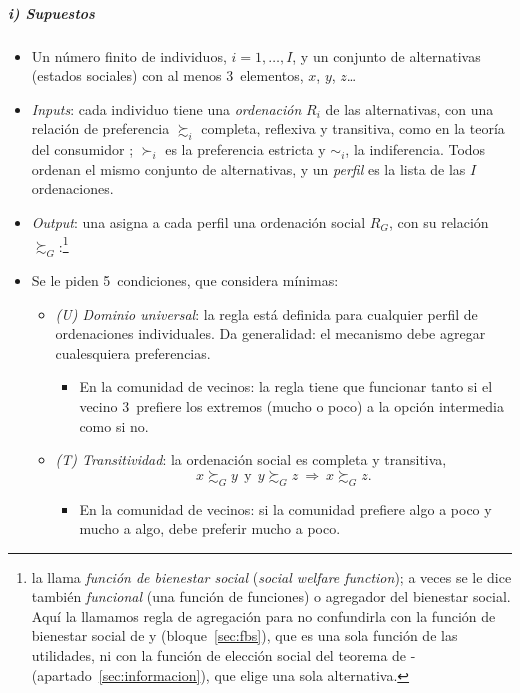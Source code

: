 \documentclass[11pt]{article}
\begin{document}
\subparagraph{i) Supuestos}

\begin{itemize}
\item Un número finito de individuos, $i=1,\dots,I$, y un conjunto de alternativas (estados sociales) con al menos 3~elementos, $x$, $y$, $z$\ldots
\item \emph{Inputs}: cada individuo tiene una \emph{ordenación} $R_i$ de las alternativas, con una relación de preferencia $\succsim_i$ completa, reflexiva y transitiva, como en la teoría del consumidor ; $\succ_i$ es la preferencia estricta y $\sim_i$, la indiferencia. Todos ordenan el mismo conjunto de alternativas, y un \emph{perfil} es la lista de las $I$ ordenaciones.
\item \emph{Output}: una  asigna a cada perfil una ordenación social $R_G$, con su relación $\succsim_G$:\footnote{ la llama \emph{función de bienestar social} (\emph{social welfare function}); a veces se le dice también \emph{funcional} (una función de funciones) o agregador del bienestar social. Aquí la llamamos regla de agregación para no confundirla con la función de bienestar social de  y  (bloque~\ref{sec:fbs}), que es una sola función de las utilidades, ni con la función de elección social del teorema de - (apartado~\ref{sec:informacion}), que elige una sola alternativa.}
\item Se le piden 5~condiciones, que  considera mínimas:
  \begin{itemize}
  \item \emph{(U) Dominio universal}: la regla está definida para cualquier perfil de ordenaciones individuales. Da generalidad: el mecanismo debe agregar cualesquiera preferencias.
    \begin{itemize}
    \item En la comunidad de vecinos: la regla tiene que funcionar tanto si el vecino 3~prefiere los extremos (mucho o poco) a la opción intermedia como si no.
    \end{itemize}
  \item \emph{(T) Transitividad}: la ordenación social es completa y transitiva,
    $$x\succsim_Gy\ \ \text{y}\ \ y\succsim_Gz\ \Rightarrow\ x\succsim_Gz.$$
    \begin{itemize}
    \item En la comunidad de vecinos: si la comunidad prefiere algo a poco y mucho a algo, debe preferir mucho a poco.

\end{itemize}
\end{itemize}
\end{itemize}
\end{document}

